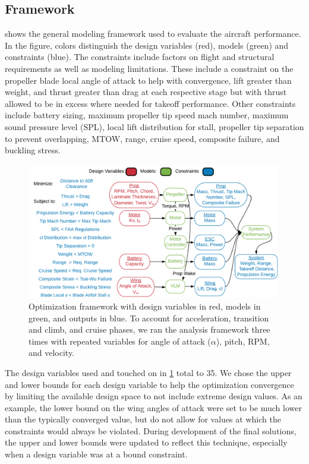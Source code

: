 \documentclass[conf]{new-aiaa}
\begin{document}
\subsection{Framework}

\label{sec:Framework}


 shows the general modeling framework used to evaluate the aircraft performance. In the figure, colors distinguish the design variables (red), models (green) and constraints (blue). The constraints include factors on flight and structural requirements as well as modeling limitations. These include a constraint on the propeller blade local angle of attack to help with convergence, lift greater than weight, and thrust greater than drag at each respective stage but with thrust allowed to be in excess where needed for takeoff performance. Other constraints include battery sizing, maximum propeller tip speed mach number, maximum sound pressure level (SPL), local lift distribution for stall, propeller tip separation to prevent overlapping, MTOW, range, cruise speed, composite failure, and buckling stress.

\begin{figure}[h!]
    \centering
    \includegraphics[trim={0.35cm 0cm 0.0cm 0cm},clip,width=0.99\textwidth]{OptDiagram-3}
    \caption{Optimization framework with design variables in red, models in green, and outputs in blue. To account for acceleration, transition and climb, and cruise phases, we ran the analysis framework three times with repeated variables for angle of attack ($\alpha$), pitch, RPM, and velocity. }
    \label{f:frameworkplan}
\end{figure}

\setlength{\tabcolsep}{5pt}

The design variables used and touched on in \cref{f:frameworkplan} total to 35. We chose the upper and lower bounds for each design variable to help the optimization convergence by limiting the available design space to not include extreme design values. As an example, the lower bound on the wing angles of attack were set to be much lower than the typically converged value, but do not allow for values at which the constraints would always be violated. During development of the final solutions, the upper and lower bounds were updated to reflect this technique, especially when a design variable was at a bound constraint.
\end{document}

